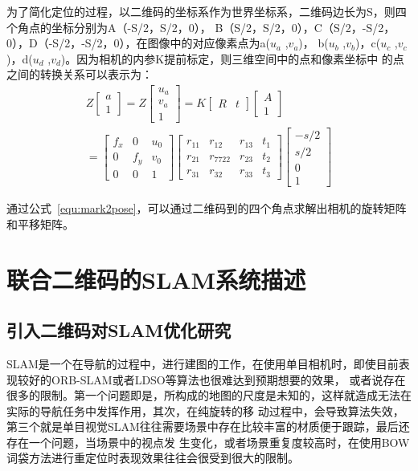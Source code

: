 为了简化定位的过程，以二维码的坐标系作为世界坐标系，二维码边长为S，则四个角点的坐标分别为A（-S/2，S/2，0），
B（S/2，S/2，0），C（S/2，-S/2，0），D（-S/2，-S/2，0），在图像中的对应像素点为a($u_a$ ,$v_a$)，
b($u_b$ ,$v_b$)，c($u_c$ ,$v_c$)，d($u_d$ ,$v_d$)。因为相机的内参K提前标定，则三维空间中的点和像素坐标中
的点之间的转换关系可以表示为：
\begin{equation}
\begin{split}
  Z{
  \left[ \begin{array}{ccc}
  a\\1
  \end{array} 
  \right ]}=Z{
  \left[ \begin{array}{ccc}
  u_a\\v_a\\1
  \end{array} \right ]}=K{
  \left[ \begin{array}{ccc}
  R&t
  \end{array} \right ]}{
  \left[ \begin{array}{ccc}
  A\\1
  \end{array} \right ]} \\
  ={
  \left[ \begin{array}{ccc}
  f_x & 0 & u_0\\0 & f_y &v_0 \\0 & 0 & 1
  \end{array} \right ]}{
  \left[ \begin{array}{cccc}
  r_{11}&r_{12}&r_{13}&t_1\\r_{21}&r_{7722}&r_{23}&t_2\\r_{31}&r_{32}&r_{33}&t_3
  \end{array} \right ]}{
  \left[ \begin{array}{ccc}
  -s/2\\s/2\\0\\1
  \end{array} \right ]}
\end{split}
\label{equ:mark2pose}
\end{equation}

通过公式~\ref{equ:mark2pose}，可以通过二维码到的四个角点求解出相机的旋转矩阵和平移矩阵。
\section{联合二维码的SLAM系统描述}
\label{sec:2.3}
\subsection{引入二维码对SLAM优化研究}
\label{sec:2.3.1}
SLAM是一个在导航的过程中，进行建图的工作，在使用单目相机时，即使目前表现较好的ORB-SLAM或者LDSO等算法也很难达到预期想要的效果，
或者说存在很多的限制。第一个问题即是，所构成的地图的尺度是未知的，这样就造成无法在实际的导航任务中发挥作用，其次，在纯旋转的移
动过程中，会导致算法失效，第三个就是单目视觉SLAM往往需要场景中存在比较丰富的材质便于跟踪，最后还存在一个问题，当场景中的视点发
生变化，或者场景重复度较高时，在使用BOW词袋方法进行重定位时表现效果往往会很受到很大的限制。

